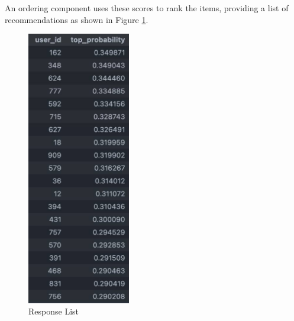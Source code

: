 An ordering component uses these scores to rank the items, providing a list of recommendations as shown in Figure \ref{fig:ResponseList}.

\begin{figure}[H]
    \centering
    \includegraphics[width=0.4\textwidth]{assets/response_list.jpg}
    \caption{Response List}
    \label{fig:ResponseList}
\end{figure}


